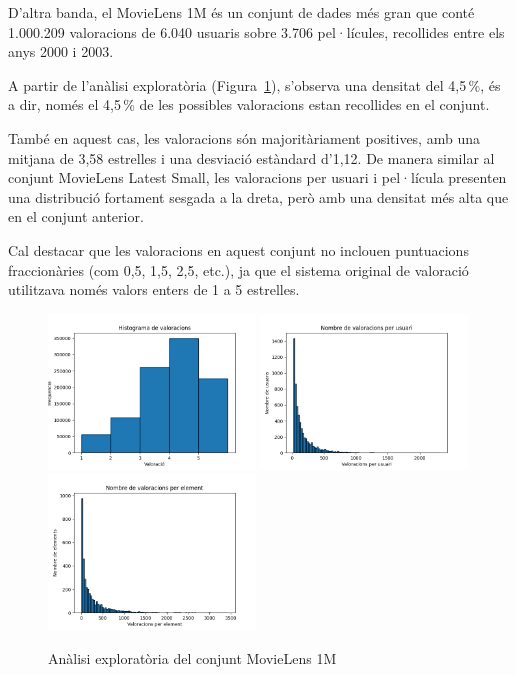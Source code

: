 \documentclass[a4paper,12pt]{report}
\begin{document}
D’altra banda, el MovieLens 1M és un conjunt de dades més gran que conté 1.000.209 valoracions de 6.040 usuaris sobre 3.706 pel·lícules, recollides entre els anys 2000 i 2003.

A partir de l’anàlisi exploratòria (Figura~\ref{fig:analisis_ml_1m}), s’observa una densitat del 4,5\,\%, és a dir, només el 4,5\,\% de les possibles valoracions estan recollides en el conjunt.

També en aquest cas, les valoracions són majoritàriament positives, amb una mitjana de 3,58 estrelles i una desviació estàndard d’1,12.
De manera similar al conjunt MovieLens Latest Small, les valoracions per usuari i pel·lícula presenten una distribució fortament sesgada a la dreta, però amb una densitat més alta que en el conjunt anterior.

Cal destacar que les valoracions en aquest conjunt no inclouen puntuacions fraccionàries (com 0,5, 1,5, 2,5, etc.), ja que el sistema original de valoració utilitzava només valors enters de 1 a 5 estrelles.

\begin{figure}[H]
    \centering
    \includegraphics[width=0.49\textwidth]{Figuras/ml-1m-ratings.png}
    \hfill
    \includegraphics[width=0.49\textwidth]{Figuras/ml-1m-users.png}
    \hfill
    \includegraphics[width=0.49\textwidth]{Figuras/ml-1m-items.png}
    \caption{Anàlisi exploratòria del conjunt MovieLens 1M}
    \label{fig:analisis_ml_1m}
\end{figure}
\end{document}
